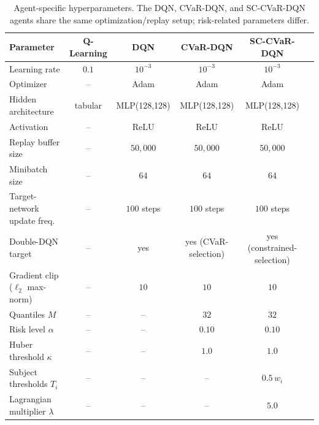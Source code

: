 \documentclass[a4paper,11pt]{article}
\theoremstyle{definition}
\begin{document}
\begin{table}[H]
\centering
\caption{Agent-specific hyperparameters. The DQN, CVaR-DQN, and SC-CVaR-DQN agents share the same optimization/replay setup; risk-related parameters differ.}
\label{tab:agent_hp}
\small
\begin{tabular}{lccccc}
\toprule
Parameter & Q-Learning & DQN & CVaR-DQN & SC-CVaR-DQN \\
\midrule
Learning rate                               & $0.1$       & $10^{-3}$  & $10^{-3}$  & $10^{-3}$ \\
Optimizer                                   & --          & Adam       & Adam       & Adam \\
Hidden architecture                         & tabular     & MLP(128,128) & MLP(128,128) & MLP(128,128) \\
Activation                                  & --          & ReLU       & ReLU       & ReLU \\
Replay buffer size                          & --          & $50{,}000$ & $50{,}000$ & $50{,}000$ \\
Minibatch size                              & --          & $64$       & $64$       & $64$ \\
Target-network update freq.                 & --          & $100$ steps & $100$ steps & $100$ steps \\
Double-DQN target                           & --          & yes        & yes (CVaR-selection) & yes (constrained-selection) \\
Gradient clip ($\ell_2$ max-norm)           & --          & $10$       & $10$       & $10$ \\
Quantiles $M$                               & --          & --         & $32$       & $32$ \\
Risk level $\alpha$                         & --          & --         & $0.10$     & $0.10$ \\
Huber threshold $\kappa$                    & --          & --         & $1.0$      & $1.0$ \\
Subject thresholds $T_i$                    & --          & --         & --         & $0.5 \, w_i$ \\
Lagrangian multiplier $\lambda$             & --          & --         & --         & $5.0$ \\
\bottomrule
\end{tabular}
\end{table}
\end{document}
